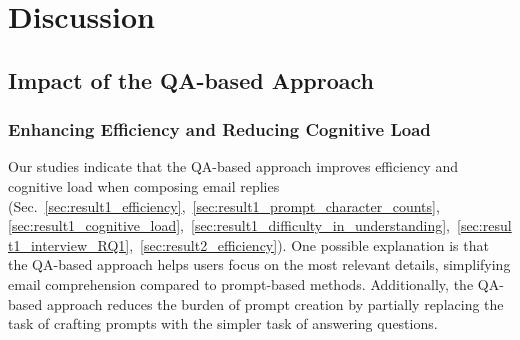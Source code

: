 \section{Discussion}

\subsection{Impact of the QA-based Approach}
\subsubsection{Enhancing Efficiency and Reducing Cognitive Load}
Our studies indicate that the QA-based approach improves efficiency and  cognitive load when composing email replies (Sec.~\ref{sec:result1_efficiency},~\ref{sec:result1_prompt_character_counts}, \ref{sec:result1_cognitive_load},~\ref{sec:result1_difficulty_in_understanding},~\ref{sec:result1_interview_RQ1},~\ref{sec:result2_efficiency}). 
One possible explanation is that the QA-based approach helps users focus on the most relevant details, simplifying email comprehension compared to prompt-based methods.
Additionally, the QA-based approach reduces the burden of prompt creation by partially replacing the task of crafting prompts with the simpler task of answering questions.
